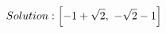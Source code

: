 \documentclass[preview]{standalone}
\begin{document}
\begin{align*}
\special{dvisvgm:raw <g id='unique000'>}Solution: \left[ -1 + \sqrt{2}, \  - \sqrt{2} - 1\right]\special{dvisvgm:raw </g>}
\end{align*}
\end{document}
